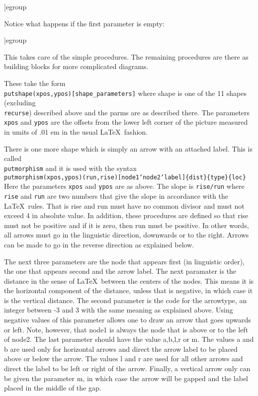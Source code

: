 {{{{{{{{\verbatim
\recurse[A`B`R`C;s`f_0`f`t_0`t]
|egroup
\begin{center}
\resetparms
\recurse[A`B`R`C;s`f_0`f`t_0`t]
\end{center}

Notice what happens if the first parameter is empty:
{\verbatim
\recurse[`B`R`C;s`f_0`f`t_0`t]
|egroup
\begin{center}
\resetparms
\recurse[`B`R`C;s`f_0`f`t_0`t]
\end{center}

This takes care of the simple procedures.  The remaining procedures are
there as building blocks for more complicated diagrams.

These take the form
\vskip0pt\noindent
{\tt \\putshape(xpos,ypos)[shape\_parameters]}
\vskip0pt\noindent
where
shape is one of the 11 shapes (excluding {\tt \\recurse}) described
above
and the parms are as described there.  The parameters {\tt  xpos} and
{\tt  ypos} are the offsets from the lower left corner of the picture
measured in umits of .01 em in the usual \LaTeX\ fashion.

There is one
more shape which is simply an arrow with an attached label.  This is
called {\tt \\putmorphism} and it is used with the syntax
\vskip0pt\noindent
{\tt
\\putmorphism(xpos,ypos)(run,rise)[node1`node2`label]\{dist\}\{type\}\{loc\}}
\vskip0pt\noindent
Here the parameters {\tt  xpos} and
{\tt  ypos} are as above.  The slope is {\tt rise/run} where {\tt rise}
and {\tt run} are two numbers that give the slope in accordance with the
\LaTeX\ rules.  That is rise and run must have no common divisor and
must not exceed 4 in absolute value.  In addition, these procedures are
defined so that rise must not be positive and if it is zero, then run
must be positive.  In other words, all arrows must go in the linguistic
direction, downwards or to the right.  Arrows can be made to go in the
reverse direction as explained below.

The next three parameters are the node that appears first (in linguistic
order), the one that appears second and the arrow label.  The next
paramater is the distance in the sense of \LaTeX\ between the centers of
the nodes.  This means it is the horizontal component of the distance,
unless that is negative, in which case it is the vertical distance.  The
second parameter is the code for the arrowtype, an integer between -3
and 3 with the same meaning as explained above.  Using negative values
of this parameter allows one to draw an arrow that goes upwards or left.
Note, however, that node1 is always the node that is above or to the
left of node2.  The last parameter should have the value a,b,l,r or m.
The values a and b are used only for horizontal arrows and direct the
arrow label to be placed above or below the arrow.  The values l and r
are used for all other arrows and direct the label to be left or right
of the arrow.  Finally, a vertical arrow only can be given the parameter
m, in which case the arrow will be gapped and the label placed in the
middle of the gap.

}}}}}}}}}
